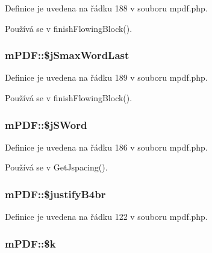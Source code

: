 Definice je uvedena na řádku 188 v souboru mpdf.\-php.



Používá se v finish\-Flowing\-Block().

\hypertarget{classm_p_d_f_a91548fde8656675d7464d5b1a2e9946b}{
\subsubsection[{\$j\-Smax\-Word\-Last}]{\setlength{\rightskip}{0pt plus 5cm}m\-P\-D\-F\-::\$j\-Smax\-Word\-Last}}\label{classm_p_d_f_a91548fde8656675d7464d5b1a2e9946b}


Definice je uvedena na řádku 189 v souboru mpdf.\-php.



Používá se v finish\-Flowing\-Block().

\hypertarget{classm_p_d_f_a342ed02df86731efec20826d3b48cb0c}{
\subsubsection[{\$j\-S\-Word}]{\setlength{\rightskip}{0pt plus 5cm}m\-P\-D\-F\-::\$j\-S\-Word}}\label{classm_p_d_f_a342ed02df86731efec20826d3b48cb0c}


Definice je uvedena na řádku 186 v souboru mpdf.\-php.



Používá se v Get\-Jspacing().

\hypertarget{classm_p_d_f_a528bb7927ac707bfdacd96b6a71ecca1}{
\subsubsection[{\$justify\-B4br}]{\setlength{\rightskip}{0pt plus 5cm}m\-P\-D\-F\-::\$justify\-B4br}}\label{classm_p_d_f_a528bb7927ac707bfdacd96b6a71ecca1}


Definice je uvedena na řádku 122 v souboru mpdf.\-php.

\hypertarget{classm_p_d_f_a7255cff4df0e32943cfff1b5c0e50f77}{
\subsubsection[{\$k}]{\setlength{\rightskip}{0pt plus 5cm}m\-P\-D\-F\-::\$k}}\label{classm_p_d_f_a7255cff4df0e32943cfff1b5c0e50f77}


